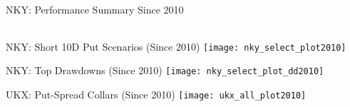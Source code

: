 \documentclass{beamer}
\begin{document}
\begin{frame}{NKY: Performance Summary Since 2010}
{\begin{tabular}{lrrrrrrrrr}
\bottomrule
\end{tabular}
}
\end{frame}

\begin{frame}{NKY: Short 10D Put Scenarios (Since 2010)}
\texttt{[image: nky\_select\_plot2010]}
\end{frame}

\begin{frame}{NKY: Top Drawdowns (Since 2010)}
\texttt{[image: nky\_select\_plot\_dd2010]}
\end{frame}

\begin{frame}{UKX: Put-Spread Collars (Since 2010)}
\texttt{[image: ukx\_all\_plot2010]}
\end{frame}
\end{document}
